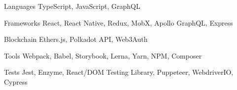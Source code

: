 

\begin{cvskills}

  \cvskill
    {Languages} %
    {TypeScript, JavaScript, GraphQL} %

  \cvskill
    {Frameworks} %
    {React, React Native, Redux, MobX, Apollo GraphQL, Express} %

  \cvskill
    {Blockchain} %
    {Ethers.js, Polkadot API, Web3Auth} %

  \cvskill
    {Tools} %
    {Webpack, Babel, Storybook, Lerna, Yarn, NPM, Composer} %

  \cvskill
    {Tests} %
    {Jest, Enzyme, React/DOM Testing Library, Puppeteer, WebdriverIO, Cypress} %

\end{cvskills}
